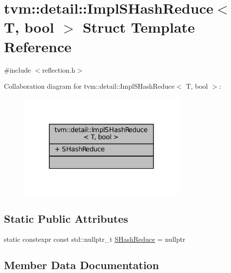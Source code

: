 \hypertarget{structtvm_1_1detail_1_1ImplSHashReduce}{}\section{tvm\+:\+:detail\+:\+:Impl\+S\+Hash\+Reduce$<$ T, bool $>$ Struct Template Reference}
\label{structtvm_1_1detail_1_1ImplSHashReduce}


{\ttfamily \#include $<$reflection.\+h$>$}



Collaboration diagram for tvm\+:\+:detail\+:\+:Impl\+S\+Hash\+Reduce$<$ T, bool $>$\+:
\nopagebreak
\begin{figure}[H]
\begin{center}
\leavevmode
\includegraphics[width=240pt]{structtvm_1_1detail_1_1ImplSHashReduce__coll__graph}
\end{center}
\end{figure}
\subsection*{Static Public Attributes}
\begin{DoxyCompactItemize}
\item 
static constexpr const std\+::nullptr\+\_\+t \hyperlink{structtvm_1_1detail_1_1ImplSHashReduce_a52b81cd95647e6f528636cfc25c48310}{S\+Hash\+Reduce} = nullptr
\end{DoxyCompactItemize}


\subsection{Member Data Documentation}

